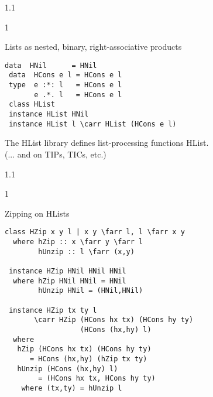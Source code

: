 \documentclass{slides}
\newenvironment{myslide}{\begin{slide}\color{Blue}\begin{boxedminipage}{1.1\hsize}\begin{boxedminipage}{1\hsize}\color{Black}
\vspace{-170\in}
}{%
\smallskip
\end{boxedminipage}
\end{boxedminipage}
\end{slide}}
\newenvironment{myslide}{\begin{slide}
}{%
\end{slide}}
\newenvironment{myslide}{\begin{slide}\color{White}\begin{boxedminipage}{1.1\hsize}\color{Black}
\vspace{-170\in}
}{%
\smallskip
\end{boxedminipage}
\end{slide}}
\newcommand{\blau}[1]{{\vspace{-50\in}\normalsize \color{Blue} #1}}
\newcommand{\farr}{\ensuremath{\to}}
\newcommand{\carr}{\ensuremath{\Rightarrow}}
\begin{document}
\begin{myslide}

\bigskip
\bigskip

\blau{Lists as nested, binary, right-associative products}

\medskip

\begin{Verbatim}[fontfamily=courier,fontsize=\small,commandchars=\\\{\}]
 data  HNil      = HNil
 data  HCons e l = HCons e l
 type  e :*: l   = HCons e l
       e .*. l   = HCons e l
 class HList
 instance HList HNil
 instance HList l \carr HList (HCons e l)
\end{Verbatim}

\medskip

The HList library defines list-processing functions HList.\\
(... and on TIPs, TICs, etc.)

\end{myslide}






\begin{myslide}

\bigskip
\bigskip

\blau{Zipping on HLists}

\medskip

\begin{Verbatim}[fontfamily=courier,fontsize=\tiny,commandchars=\\\!\?]
 class HZip x y l | x y \farr l, l \farr x y
  where hZip :: x \farr y \farr l
        hUnzip :: l \farr (x,y)

 instance HZip HNil HNil HNil
  where hZip HNil HNil = HNil
        hUnzip HNil = (HNil,HNil)

 instance HZip tx ty l
       \carr HZip (HCons hx tx) (HCons hy ty)
                  (HCons (hx,hy) l)
  where
   hZip (HCons hx tx) (HCons hy ty)
      = HCons (hx,hy) (hZip tx ty)
   hUnzip (HCons (hx,hy) l)
        = (HCons hx tx, HCons hy ty)
    where (tx,ty) = hUnzip l
\end{Verbatim}


\end{myslide}



\end{document}
